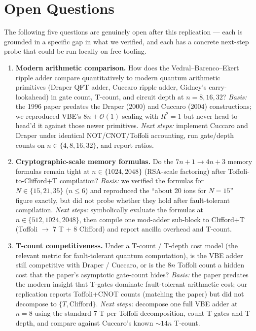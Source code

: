 \section{Open Questions}
\label{sec:open-questions}

The following five questions are genuinely open after this replication --- each
is grounded in a specific gap in what we verified, and each has a concrete
next-step probe that could be run locally on free tooling.

\begin{enumerate}

\item \textbf{Modern arithmetic comparison.}
How does the Vedral--Barenco--Ekert ripple adder compare quantitatively to
modern quantum arithmetic primitives (Draper QFT adder, Cuccaro ripple adder,
Gidney's carry-lookahead) in gate count, T-count, and circuit depth at
$n{=}8, 16, 32$?
\emph{Basis:} the 1996 paper predates the Draper (2000) and Cuccaro (2004)
constructions; we reproduced VBE's $8n + \mathcal{O}(1)$ scaling with $R^{2}{=}1$
but never head-to-head'd it against those newer primitives.
\emph{Next steps:} implement Cuccaro and Draper under identical
NOT/CNOT/Toffoli accounting, run gate/depth counts on $n \in \{4,8,16,32\}$,
and report ratios.

\item \textbf{Cryptographic-scale memory formulas.}
Do the $7n{+}1 \to 4n{+}3$ memory formulas remain tight at $n \in \{1024, 2048\}$
(RSA-scale factoring) after Toffoli-to-Clifford+T compilation?
\emph{Basis:} we verified the formulas for $N \in \{15, 21, 35\}$
($n \le 6$) and reproduced the ``about 20 ions for $N{=}15$'' figure exactly,
but did not probe whether they hold after fault-tolerant compilation.
\emph{Next steps:} symbolically evaluate the formulas at $n \in \{512, 1024, 2048\}$,
then compile one mod-adder sub-block to Clifford+T (Toffoli $\to$ 7 T + 8 Clifford)
and report ancilla overhead and T-count.

\item \textbf{T-count competitiveness.}
Under a T-count / T-depth cost model (the relevant metric for fault-tolerant
quantum computation), is the VBE adder still competitive with Draper / Cuccaro,
or is the $8n$ Toffoli count a hidden cost that the paper's asymptotic
gate-count hides?
\emph{Basis:} the paper predates the modern insight that T-gates dominate
fault-tolerant arithmetic cost; our replication reports Toffoli+CNOT counts
(matching the paper) but did not decompose to $\{T, \text{Clifford}\}$.
\emph{Next steps:} decompose one full VBE adder at $n{=}8$ using the standard
7-T-per-Toffoli decomposition, count T-gates and T-depth, and compare against
Cuccaro's known $\sim\!14n$ T-count.


\end{enumerate}
